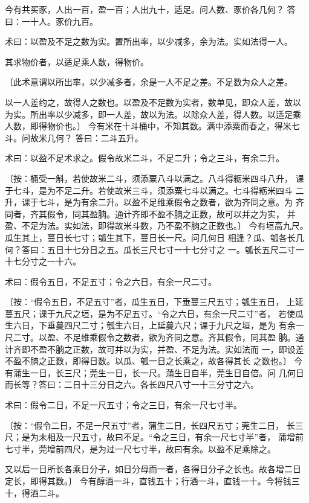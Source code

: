 \documentclass[a4paper,12pt,UTF8,twoside]{ctexbook}
\begin{document}
今有共买豕，人出一百，盈一百；人出九十，适足。问人数、豕价各几何？ 答曰：一十人。豕价九百。

术曰：以盈及不足之数为实。置所出率，以少减多，余为法。实如法得一人。

其求物价者，以适足乘人数，得物价。

〔此术意谓以所出率，以少减多者，余是一人不足之差。不足数为众人之差。

以一人差约之，故得人之数也。以盈及不足数为实者，数单见，即众人差，故以 为实。所出率以少减多，即一人差，故以为法。以除众人差，得人数。以适足乘 人数，即得物价也。〕 今有米在十斗桶中，不知其数。满中添粟而舂之，得米七斗。问故米几何？ 答曰：二斗五升。

术曰：以盈不足术求之。假令故米二斗，不足二升；令之三斗，有余二升。

〔按：桶受一斛，若使故米二斗，须添粟八斗以满之。八斗得粝米四斗八升， 课于七斗，是为不足二升。若使故米三斗，须添粟七斗以满之。七斗得粝米四斗 二升，课于七斗，是为有余二升。以盈不足维乘假令之数者，欲为齐同之意。为 齐同者，齐其假令，同其盈朒。通计齐即不盈不朒之正数，故可以并之为实， 并盈、不足为法。实如法，即得故米斗数，乃不盈不朒之正数也。〕 今有垣高九尺。瓜生其上，蔓日长七寸；瓠生其下，蔓日长一尺。问几何日 相逢？瓜、瓠各长几何？答曰：五日十七分日之五。瓜长三尺七寸一十七分寸之 一。瓠长五尺二寸一十七分寸之一十六。

术曰：假令五日，不足五寸；令之六日，有余一尺二寸。

〔按：“假令五日，不足五寸”者，瓜生五日，下垂蔓三尺五寸；瓠生五日， 上延蔓五尺；课于九尺之垣，是为不足五寸。“令之六日，有余一尺二寸”者， 若使瓜生六日，下垂蔓四尺二寸；瓠生六日，上延蔓六尺；课于九尺之垣，是为 有余一尺二寸。以盈、不足维乘假令之数者，欲为齐同之意。齐其假令，同其盈 朒。通计齐即不盈不朒之正数，故可并以为实，并盈、不足为法。实如法而 一，即设差不盈不朒之正数，即得日数。以瓜、瓠一日之长乘之，故各得其长 之数也。〕 今有蒲生一日，长三尺；莞生一日，长一尺。蒲生日自半，莞生日自倍。问 几何日而长等？答曰：二日十三分日之六。各长四尺八寸一十三分寸之六。

术曰：假令二日，不足一尺五寸；令之三日，有余一尺七寸半。

〔按：“假令二日，不足一尺五寸”者，蒲生二日，长四尺五寸；莞生二日， 长三尺；是为未相及一尺五寸，故曰不足。“令之三日，有余一尺七寸半”者， 蒲增前七寸半，莞增前四尺，是为过一尺七寸半，故曰有余。以盈不足乘除之。

又以后一日所长各乘日分子，如日分母而一者，各得日分子之长也。故各增二日 定长，即得其数。〕 今有醇酒一斗，直钱五十；行酒一斗，直钱一十。今将钱三十，得酒二斗。
\end{document}
